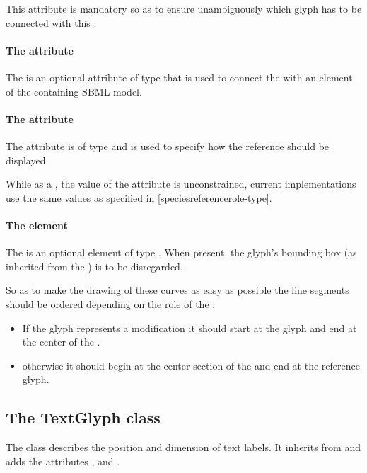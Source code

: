 This attribute is mandatory so as to ensure unambiguously which glyph has to be 
connected with this \GeneralGlyph. 


\paragraph{The  attribute}
The  is an optional attribute of type  
that is used to connect the \ReferenceGlyph with an element of the 
containing SBML model. 

\paragraph{The  attribute}
The  attribute is of type  and is used to 
specify how the reference should be displayed. 

While as a , the value of the  attribute is 
unconstrained, current implementations use the same values as specified 
in \ref{speciesreferencerole-type}. 


\paragraph{The  element}
The  is an optional element of type \Curve. When present, 
the glyph's bounding box (as inherited from the \GraphicalObject) is to 
be disregarded. 

So as to make the drawing of these curves as easy as possible the line 
segments should be ordered depending on the role of the \ReferenceGlyph:

\begin{itemize}
	\item If the glyph represents a modification it should start at the glyph and end at the center of the \GeneralGlyph.
	\item otherwise it should begin at the center section of the \GeneralGlyph and end at the reference glyph. 
\end{itemize}


\subsection{The TextGlyph class}
\label{textglyph-class}
The \TextGlyph class describes the position and dimension of text 
labels. It inherits from \GraphicalObject and adds the attributes 
,  and . 

